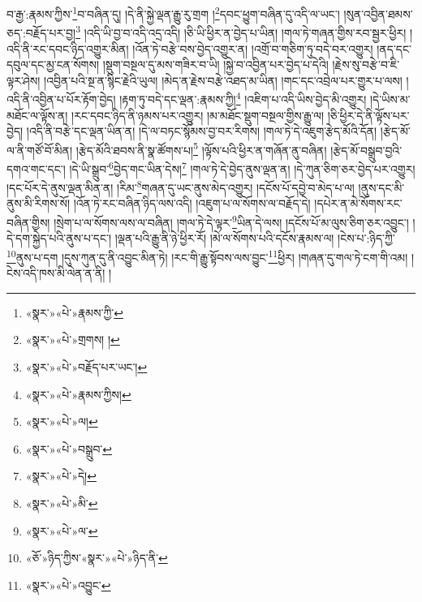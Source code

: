 བ་རྒྱ་:རྣམས་ཀྱིས་\footnote{«སྣར་»«པེ་»རྣམས་ཀྱི་}བ་བཞིན་དུ། །དེ་ནི་སྐྱེ་ལྡན་རྒྱུ་རུ་གྲག །\footnote{«སྣར་»«པེ་»གྲགས། །}དབང་ཕྱུག་བཞིན་དུ་འདི་ལ་ཡང་། །སུན་འབྱིན་ཐམས་ཅད་:བརྗོད་པར་བྱ།\footnote{«སྣར་»«པེ་»བརྗོད་པར་ཡང་།} །འདི་ཡི་བྱ་བ་འདི་འདྲ་འདི། །ཅི་ཡི་ཕྱིར་ན་བྱེད་པ་ཡིན། །གལ་ཏེ་གཞན་གྱིས་རབ་སྦྱར་ཕྱིར། །འདི་ནི་རང་དབང་ཉིད་འགྱུར་མིན། །འོན་ཏེ་བརྩེ་བས་བྱེད་འགྱུར་ན། །འགྲོ་བ་གཅིག་ཏུ་བདེ་བར་འགྱུར། །ནད་དང་དབུལ་དང་མྱ་ངན་སོགས། །སྡུག་བསྔལ་དུ་མས་གཟིར་བ་ཡི། །སྐྱེ་བ་འབྱིན་པར་བྱེད་པ་དེའི། །རྗེས་སུ་བརྩེ་བ་ཇི་ལྟར་ཤེས། །འབྱིན་པའི་སྔ་ན་སྙིང་རྗེའི་ཡུལ། །མེད་ན་རྗེས་བརྩེ་འཐད་མ་ཡིན། །གང་དང་འབྲེལ་པར་གྱུར་པ་ལས། །འདི་ནི་འབྱིན་པ་པོར་རྟོག་བྱེད། །རྟག་ཏུ་བདེ་དང་ལྡན་:རྣམས་ཀྱི།\footnote{«སྣར་»«པེ་»རྣམས་ཀྱིས།} །འཇིག་པ་འདི་ཡིས་བྱེད་མི་འགྱུར། །དེ་ཡིས་མ་མཐོང་ལ་ལྟོས་ན། །རང་དབང་ཉིད་ནི་ཉམས་པར་འགྱུར། །མ་མཐོང་སྡུག་བསྔལ་གྱིས་རྒྱུ་ལ། །ཅི་ཕྱིར་དེ་ནི་ལྟོས་པར་བྱེད། །འདི་ནི་བརྩེ་དང་ལྡན་ཡིན་ན། །དེ་ལ་བཏང་སྙོམས་བྱ་བར་རིགས། །གལ་ཏེ་དེ་འཇུག་རྩེད་མོའི་དོན། །རྩེད་མོ་ལ་ནི་གཙོ་བོ་མིན། །རྩེད་མོའི་ཐབས་ནི་སྣ་ཚོགས་པ།\footnote{«སྣར་»«པེ་»ལ།} །ལྟོས་པའི་ཕྱིར་ན་གཞོན་ནུ་བཞིན། །རྩེད་མོ་བསྒྲུབ་བྱའི་དགའ་གང་དང་། །དེ་ཡི་སྒྲུབ་\footnote{«སྣར་»«པེ་»བསྒྲུབ་}བྱེད་གང་ཡིན་དེས།\footnote{«སྣར་»«པེ་»དེ།} །གལ་ཏེ་དེ་བྱེད་ནུས་ལྡན་ན། །དེ་ཀུན་ཅིག་ཅར་བྱེད་པར་འགྱུར། །དང་པོར་དེ་ནུས་ལྡན་མིན་ན། །རིམ་\footnote{«སྣར་»«པེ་»མི་}གཞན་དུ་ཡང་ནུས་མེད་འགྱུར། །དངོས་པོ་དབྱེ་བ་མེད་པ་ལ། །ནུས་དང་མི་ནུས་མི་རིགས་སོ། །འོན་ཏེ་རང་བཞིན་ཉིད་ལས་འདི། །འཇུག་པ་ལ་སོགས་ལ་བརྗོད་དེ། །དཔེར་ན་མེ་སོགས་རང་བཞིན་གྱིས། །སྲེག་པ་ལ་སོགས་ལས་ལ་བཞིན། །གལ་ཏེ་དེ་ལྟར་\footnote{«སྣར་»«པེ་»ལ་}ཡིན་དེ་ལས། །དངོས་པོ་མ་ལུས་ཅིག་ཅར་འབྱུང་། །དེ་དག་སྐྱེད་པའི་ནུས་པ་དང་། །ལྡན་པའི་རྒྱུ་ནི་ཉེ་ཕྱིར་རོ། །མེ་ལ་སོགས་པའི་དངོས་རྣམས་ལ། །ངེས་པ་:ཉིད་ཀྱི་\footnote{«ཅོ་»ཉིད་ཀྱིས་«སྣར་»«པེ་»ཉིད་ནི་}ནུས་པ་དག །དུས་ཀུན་དུ་ནི་འབྱུང་མིན་ཏེ། །རང་གི་རྒྱུ་སྟོབས་ལས་བྱུང་\footnote{«སྣར་»«པེ་»འབྱུང་}ཕྱིར། །གཞན་དུ་གལ་ཏེ་ངག་གི་འམ། །ངེས་འདི་ཁས་མི་ལེན་ན་ནི། །
